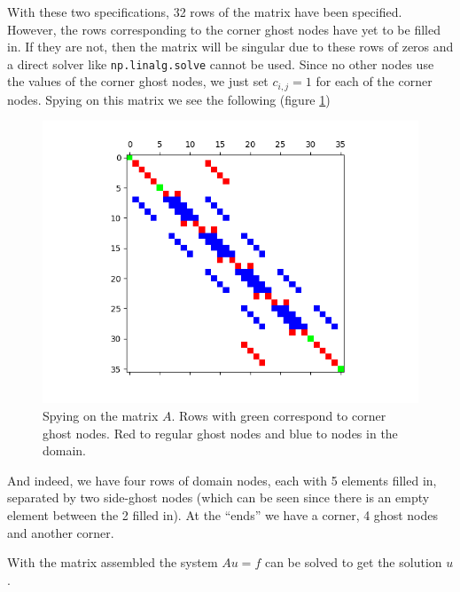\documentclass[sigconf]{acmart}
\begin{document}
With these two specifications, 32 rows of the matrix have been specified. However, the rows corresponding to the corner ghost nodes have yet to be filled in. If they are not, then the matrix will be singular due to these rows of zeros and a direct solver like \texttt{np.linalg.solve} cannot be used. Since no other nodes use the values of the corner ghost nodes, we just set $ c_{i,j} = 1 $ for each of the corner nodes. Spying on this matrix we see the following (figure \ref{fig:spy})
\begin{figure}
	\centering
	\includegraphics[width=\linewidth]{spy.png}
	\caption{Spying on the matrix $ A $. Rows with green correspond to corner ghost nodes. Red to regular ghost nodes and blue to nodes in the domain.}
	\label{fig:spy}
\end{figure}
And indeed, we have four rows of domain nodes, each with 5 elements filled in, separated by two side-ghost nodes (which can be seen since there is an empty element between the 2 filled in). At the ``ends'' we have a corner, 4 ghost nodes and another corner.

With the matrix assembled the system $ Au=f $ can be solved to get the solution $ u $.
\end{document}
